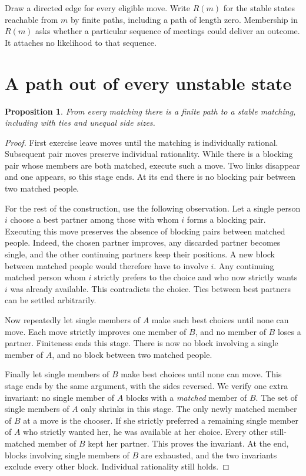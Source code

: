 \documentclass[11pt]{article}
\newtheorem{proposition}{Proposition}
\begin{document}
Draw a directed edge for every eligible move. Write \(R(m)\) for the stable states reachable from \(m\) by finite paths, including a path of length zero. Membership in \(R(m)\) asks whether a particular sequence of meetings could deliver an outcome. It attaches no likelihood to that sequence.

\section{A path out of every unstable state}

\begin{proposition}
From every matching there is a finite path to a stable matching, including with ties and unequal side sizes.
\end{proposition}

\begin{proof}
First exercise leave moves until the matching is individually rational. Subsequent pair moves preserve individual rationality. While there is a blocking pair whose members are both matched, execute such a move. Two links disappear and one appears, so this stage ends. At its end there is no blocking pair between two matched people.

For the rest of the construction, use the following observation. Let a single person \(i\) choose a best partner among those with whom \(i\) forms a blocking pair. Executing this move preserves the absence of blocking pairs between matched people. Indeed, the chosen partner improves, any discarded partner becomes single, and the other continuing partners keep their positions. A new block between matched people would therefore have to involve \(i\). Any continuing matched person whom \(i\) strictly prefers to the choice and who now strictly wants \(i\) was already available. This contradicts the choice. Ties between best partners can be settled arbitrarily.

Now repeatedly let single members of \(A\) make such best choices until none can move. Each move strictly improves one member of \(B\), and no member of \(B\) loses a partner. Finiteness ends this stage. There is now no block involving a single member of \(A\), and no block between two matched people.

Finally let single members of \(B\) make best choices until none can move. This stage ends by the same argument, with the sides reversed. We verify one extra invariant: no single member of \(A\) blocks with a \emph{matched} member of \(B\). The set of single members of \(A\) only shrinks in this stage. The only newly matched member of \(B\) at a move is the chooser. If she strictly preferred a remaining single member of \(A\) who strictly wanted her, he was available at her choice. Every other still-matched member of \(B\) kept her partner. This proves the invariant. At the end, blocks involving single members of \(B\) are exhausted, and the two invariants exclude every other block. Individual rationality still holds.
\end{proof}
\end{document}

